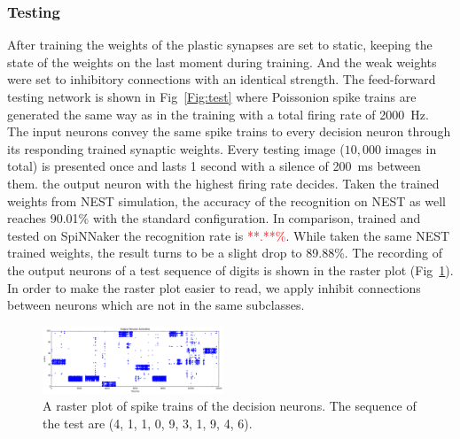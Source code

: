 \subsubsection{Testing}
After training the weights of the plastic synapses are set to static, keeping the state of the weights on the last moment during training.
And the weak weights were set to inhibitory connections with an identical strength.
The feed-forward testing network is shown in Fig~\ref{Fig:test} where Poissonion spike trains are generated the same way as in the training with a total firing rate of 2000~Hz.
The input neurons convey the same spike trains to every decision neuron through its responding trained synaptic weights. 
Every testing image ($10,000$ images in total) is presented once and lasts 1 second with a silence of 200~ms between them.
the output neuron with the highest firing rate decides.
Taken the trained weights from NEST simulation, the accuracy of the recognition on NEST as well reaches 90.01\% with the standard configuration.
In comparison, trained and tested on SpiNNaker the recognition rate is \textcolor{red}{**.**\%}.
While taken the same NEST trained weights, the result turns to be a slight drop to 89.88\%.
The recording of the output neurons of a test sequence of digits is shown in the raster plot (Fig~\ref{Fig:output}).
In order to make the raster plot easier to read, we apply inhibit connections between neurons which are not in the same subclasses.


\begin{figure}[hbt!]
	\centering
	\includegraphics[width=0.48\textwidth]{images/test300-301.pdf}
	\caption{A raster plot of spike trains of the decision neurons. The sequence of the test are (4, 1, 1, 0, 9, 3, 1, 9, 4, 6).}
	\label{Fig:output}
\end{figure} 
